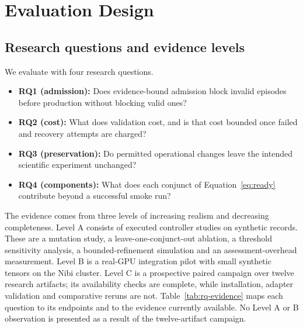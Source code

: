 \section{Evaluation Design}\label{sec:evaluation}
\subsection{Research questions and evidence levels}\label{sec:rqs}
We evaluate \tool{} with four research questions.
\begin{itemize}
\item \textbf{RQ1 (admission):} Does evidence-bound admission block invalid episodes before production without blocking valid ones?
\item \textbf{RQ2 (cost):} What does validation cost, and is that cost bounded once failed and recovery attempts are charged?
\item \textbf{RQ3 (preservation):} Do permitted operational changes leave the intended scientific experiment unchanged?
\item \textbf{RQ4 (components):} What does each conjunct of Equation~\eqref{eq:ready} contribute beyond a successful smoke run?
\end{itemize}

The evidence comes from three levels of increasing realism and decreasing completeness. Level A consists of executed controller studies on synthetic records. These are a mutation study, a leave-one-conjunct-out ablation, a threshold sensitivity analysis, a bounded-refinement simulation and an assessment-overhead measurement. Level B is a real-GPU integration pilot with small synthetic tensors on the Nibi cluster. Level C is a prospective paired campaign over twelve research artifacts; its availability checks are complete, while installation, adapter validation and comparative reruns are not. Table~\ref{tab:rq-evidence} maps each question to its endpoints and to the evidence currently available. No Level A or B observation is presented as a result of the twelve-artifact campaign.

